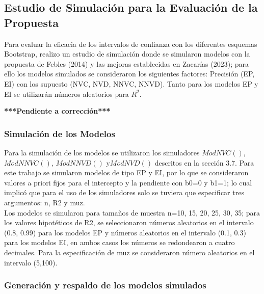 	 
\subsection{Estudio de Simulación para la Evaluación de la Propuesta}

Para evaluar la eficacia de los intervalos de confianza con los diferentes esquemas Bootstrap, realizo un estudio de simulación donde se simularon modelos con la propuesta de Febles (2014) y las mejoras establecidas en Zacarías (2023); para ello los modelos simulados se consideraron los siguientes factores: Precisión (EP, EI) con los supuesto (NVC, NVD, NNVC, NNVD). Tanto para los modelos EP y EI se utilizarán números aleatorios para $R^{2}$.

\textbf{***Pendiente a corrección***}

\subsubsection{Simulación de los Modelos}
Para la simulación de los modelos se utilizaron los simuladores $ModNVC()$, $ModNNVC()$, $ModNNVD()$ y$ ModNVD()$ descritos en la sección 3.7. Para este trabajo se simularon modelos de tipo EP y EI, por lo que se consideraron valores a priori fijos para el intercepto y la pendiente con b0=0 y b1=1; lo cual implicó que para el uso de los simuladores solo se tuviera que especificar tres argumentos: n, R2 y muz.\\

Los modelos se simularon para tamaños de muestra n=10, 15, 20, 25, 30, 35; para los valores hipotéticos de R2, se seleccionaron números aleatorios en el intervalo (0.8, 0.99) para los modelos EP y números aleatorios en el intervalo (0.1, 0.3) para los modelos EI, en ambos casos los números se redondearon a cuatro decimales. Para la especificación de muz se consideraron número aleatorios en el intervalo (5,100).\\
 

\subsubsection{Generación y respaldo de los modelos simulados}

